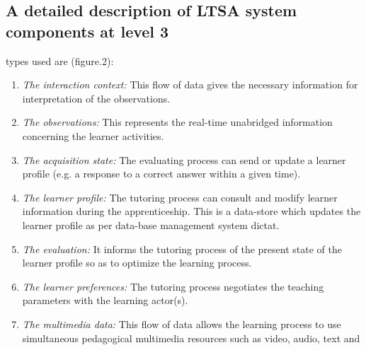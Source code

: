 \subsection{A detailed description of LTSA system components at level 3}
 \blindtext types used are \cite{ltsa} (figure.2):
\begin{enumerate}
 \item \textit{The interaction context:} This flow of data gives the necessary information for
    interpretation of the observations.
\item \textit{The observations:} This represents the real-time unabridged information concerning the learner activities.
\item \textit{The acquisition state:} The evaluating process can send or update a learner profile (e.g. a response to a correct answer within a given time).
\item \textit{The learner profile:} The tutoring process can consult and modify learner information during the apprenticeship. This is a data-store
    which updates the learner profile as per data-base management system dictat.
\item \textit{The evaluation:} It informs the tutoring process of the present state of the
    learner profile so as to optimize the learning process.

\item  \textit{The learner preferences:} The tutoring process negotiates the teaching parameters with the learning actor(s).
\item  \textit{The multimedia data:} This flow of data allows the learning process to use simultaneous pedagogical multimedia resources such as video, audio, text and

\end{enumerate}
